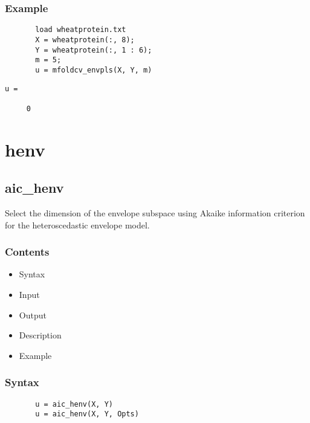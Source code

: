 \documentclass[a4paper,11pt,openany]{memoir}
\begin{document}
\subsection*{Example}


\begin{verbatim}       load wheatprotein.txt
       X = wheatprotein(:, 8);
       Y = wheatprotein(:, 1 : 6);
       m = 5;
       u = mfoldcv_envpls(X, Y, m)\end{verbatim}
    
        \color{lightgray} \ttfamily\begin{verbatim}
u =

     0

\end{verbatim} \rmfamily
\color{black}

\newpage

\chapter{henv}

\rmfamily
\color{black}\section{aic\_henv}

\begin{par}
Select the dimension of the envelope subspace using Akaike information criterion for the heteroscedastic envelope model.
\end{par} \vspace{1em}

\subsection*{Contents}

\begin{itemize}
\setlength{\itemsep}{-1ex}
   \item Syntax
   \item Input
   \item Output
   \item Description
   \item Example
\end{itemize}


\subsection*{Syntax}


\begin{verbatim}       u = aic_henv(X, Y)
       u = aic_henv(X, Y, Opts)\end{verbatim}
    
\end{document}
